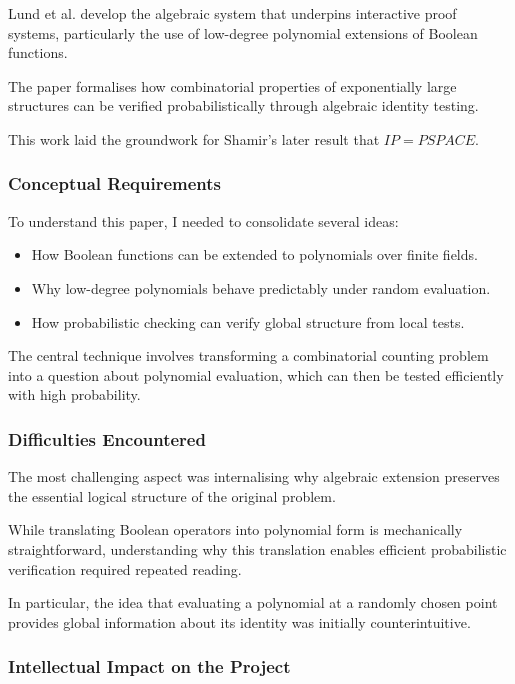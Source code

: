 \documentclass[12pt]{article}
\begin{document}
Lund et al. develop the algebraic system that underpins interactive proof systems, particularly the use of low-degree polynomial extensions of Boolean functions.

The paper formalises how combinatorial properties of exponentially large structures can be verified probabilistically through algebraic identity testing.

This work laid the groundwork for Shamir's later result that $IP = PSPACE$.

\subsubsection*{Conceptual Requirements}

To understand this paper, I needed to consolidate several ideas:

\begin{itemize}
\item How Boolean functions can be extended to polynomials over finite fields.
\item Why low-degree polynomials behave predictably under random evaluation.
\item How probabilistic checking can verify global structure from local tests.
\end{itemize}

The central technique involves transforming a combinatorial counting problem into a question about polynomial evaluation, which can then be tested efficiently with high probability.

\subsubsection*{Difficulties Encountered}

The most challenging aspect was internalising why algebraic extension preserves the essential logical structure of the original problem.

While translating Boolean operators into polynomial form is mechanically straightforward, understanding why this translation enables efficient probabilistic verification required repeated reading.

In particular, the idea that evaluating a polynomial at a randomly chosen point provides global information about its identity was initially counterintuitive.

\subsubsection*{Intellectual Impact on the Project}
\end{document}
